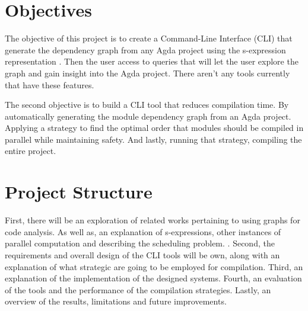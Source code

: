 \section{Objectives}

The objective of this project is to create a Command-Line Interface (CLI) that
generate the dependency graph from any Agda project using the s-expression
representation \cite{andrej}. Then the user access to queries that will let the
user explore the graph and gain insight into the Agda project. There aren't
any tools currently that have these features. 

The second objective is to build a CLI tool that reduces compilation time. By
automatically generating the module dependency graph from an Agda project.
Applying a strategy to find the optimal order that modules should be compiled
in parallel while maintaining safety. And lastly, running that strategy,
compiling the entire project.

\section{Project Structure}

First, there will be an exploration of related works pertaining to using graphs
for code analysis. As well as, an explanation of s-expressions, other instances
of parallel computation and describing the scheduling problem. . Second, the requirements
and overall design of the CLI tools will be own, along with an explanation of
what strategic are going to be employed for compilation. Third, an explanation
of the implementation of the designed systems. Fourth, an evaluation of the
tools and the performance of the compilation strategies. Lastly, an overview of
the results, limitations and future improvements.

